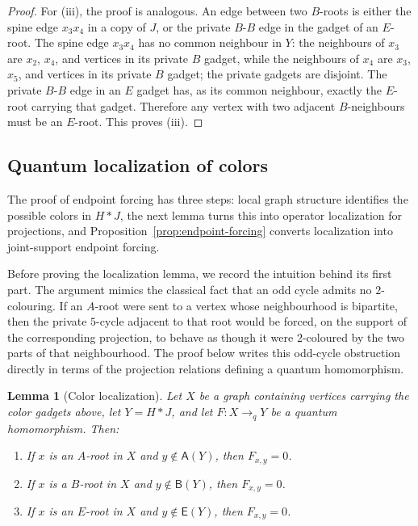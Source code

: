\documentclass[11pt]{amsart}
\theoremstyle{plain}
\newtheorem{lemma}[theorem]{Lemma}
\theoremstyle{definition}
\newcommand{\toq}{\to_q}
\newcommand{\Aset}{\mathsf A}
\newcommand{\Bset}{\mathsf B}
\newcommand{\Eset}{\mathsf E}
\begin{document}
\begin{proof}
For (iii), the proof is analogous.  An edge between two $B$-roots is either the spine edge $x_3x_4$ in a copy of $J$, or the private $B$-$B$ edge in the gadget of an $E$-root.  The spine edge $x_3x_4$ has no common neighbour in $Y$: the neighbours of $x_3$ are $x_2$, $x_4$, and vertices in its private $B$ gadget, while the neighbours of $x_4$ are $x_3$, $x_5$, and vertices in its private $B$ gadget; the private gadgets are disjoint.  The private $B$-$B$ edge in an $E$ gadget has, as its common neighbour, exactly the $E$-root carrying that gadget.  Therefore any vertex with two adjacent $B$-neighbours must be an $E$-root.  This proves (iii).
\end{proof}

\subsection{Quantum localization of colors}

The proof of endpoint forcing has three steps: local graph structure identifies the possible colors in $H*J$, the next lemma turns this into operator localization for projections, and Proposition~\ref{prop:endpoint-forcing} converts localization into joint-support endpoint forcing.

Before proving the localization lemma, we record the intuition behind its first part.  The argument mimics the classical fact that an odd cycle admits no $2$-colouring.  If an $A$-root were sent to a vertex whose neighbourhood is bipartite, then the private $5$-cycle adjacent to that root would be forced, on the support of the corresponding projection, to behave as though it were $2$-coloured by the two parts of that neighbourhood.  The proof below writes this odd-cycle obstruction directly in terms of the projection relations defining a quantum homomorphism.

\begin{lemma}[Color localization]\label{lem:color-localization}
Let $X$ be a graph containing vertices carrying the color gadgets above, let $Y=H*J$, and let $F:X\toq Y$ be a quantum homomorphism.  Then:
\begin{enumerate}[label=\textup{(\roman*)}]
\item If $x$ is an $A$-root in $X$ and $y\notin \Aset(Y)$, then $F_{x,y}=0$.
\item If $x$ is a $B$-root in $X$ and $y\notin \Bset(Y)$, then $F_{x,y}=0$.
\item If $x$ is an $E$-root in $X$ and $y\notin \Eset(Y)$, then $F_{x,y}=0$.
\end{enumerate}
\end{lemma}
\end{document}
